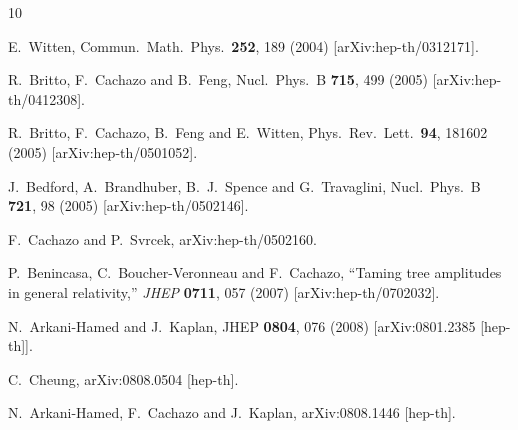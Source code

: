 \documentclass[12pt]{article}
\begin{document}
\begin{thebibliography}{10}

  E.~Witten,
  Commun.\ Math.\ Phys.\  {\bf 252}, 189 (2004)
  [arXiv:hep-th/0312171].

  R.~Britto, F.~Cachazo and B.~Feng,
  Nucl.\ Phys.\  B {\bf 715}, 499 (2005)
  [arXiv:hep-th/0412308].

 R.~Britto, F.~Cachazo, B.~Feng and E.~Witten,
  Phys.\ Rev.\ Lett.\  {\bf 94}, 181602 (2005)
  [arXiv:hep-th/0501052].

  J.~Bedford, A.~Brandhuber, B.~J.~Spence and G.~Travaglini,
  Nucl.\ Phys.\  B {\bf 721}, 98 (2005)
  [arXiv:hep-th/0502146].

  F.~Cachazo and P.~Svrcek,
  arXiv:hep-th/0502160.

  P.~Benincasa, C.~Boucher-Veronneau and F.~Cachazo,
  ``{Taming tree amplitudes in general relativity},''
  {\em JHEP} {\bf 0711}, 057 (2007)
  [arXiv:hep-th/0702032].


  N.~Arkani-Hamed and J.~Kaplan,
  JHEP {\bf 0804}, 076 (2008)
  [arXiv:0801.2385 [hep-th]].

  C.~Cheung,
  arXiv:0808.0504 [hep-th].


  N.~Arkani-Hamed, F.~Cachazo and J.~Kaplan,
  arXiv:0808.1446 [hep-th].


\end{thebibliography}
\end{document}
